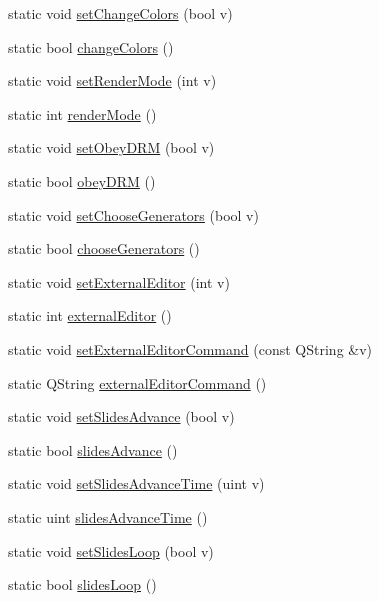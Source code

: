 \begin{DoxyCompactItemize}
static void \hyperlink{classOkular_1_1SettingsCore_a4fb9293ad6123555f4dde8d8695a288d}{set\+Change\+Colors} (bool v)
\item 
static bool \hyperlink{classOkular_1_1SettingsCore_af01449e331a4e973d5cb3879a3e76081}{change\+Colors} ()
\item 
static void \hyperlink{classOkular_1_1SettingsCore_a6e942364ec55191916e68be6ebeb852f}{set\+Render\+Mode} (int v)
\item 
static int \hyperlink{classOkular_1_1SettingsCore_a6fcb9ee5ad7a92b49ad31344771cca2d}{render\+Mode} ()
\item 
static void \hyperlink{classOkular_1_1SettingsCore_ae07e93cb9f46431bab5e2d505c925335}{set\+Obey\+D\+R\+M} (bool v)
\item 
static bool \hyperlink{classOkular_1_1SettingsCore_a82fd038193ed2d82ac25e7c1918c09e6}{obey\+D\+R\+M} ()
\item 
static void \hyperlink{classOkular_1_1SettingsCore_ac5989b63ba7f059c6820c5498cd3f7e5}{set\+Choose\+Generators} (bool v)
\item 
static bool \hyperlink{classOkular_1_1SettingsCore_acceeadb86e54c1c6b6141ff06c3165f1}{choose\+Generators} ()
\item 
static void \hyperlink{classOkular_1_1SettingsCore_a66de61ae5a760b2aca818315678d2a77}{set\+External\+Editor} (int v)
\item 
static int \hyperlink{classOkular_1_1SettingsCore_afb3fbb0d886a4d9619be4f289e091caf}{external\+Editor} ()
\item 
static void \hyperlink{classOkular_1_1SettingsCore_acdef582fb6dd1d8d778505ed9f425723}{set\+External\+Editor\+Command} (const Q\+String \&v)
\item 
static Q\+String \hyperlink{classOkular_1_1SettingsCore_a2eae0942d8ffbed99c7b9198f2dc03f2}{external\+Editor\+Command} ()
\item 
static void \hyperlink{classOkular_1_1SettingsCore_ae8fd0222c7cc648911fadd0737465baf}{set\+Slides\+Advance} (bool v)
\item 
static bool \hyperlink{classOkular_1_1SettingsCore_ae778283eb0b083eb09f97f81545f683d}{slides\+Advance} ()
\item 
static void \hyperlink{classOkular_1_1SettingsCore_aa659d9f4caa8ba3b27e8cc63ecd08c6b}{set\+Slides\+Advance\+Time} (uint v)
\item 
static uint \hyperlink{classOkular_1_1SettingsCore_a9d85611b6fa275a51c57b84c375d27f4}{slides\+Advance\+Time} ()
\item 
static void \hyperlink{classOkular_1_1SettingsCore_a167a085d32e415613afa64877c01b0da}{set\+Slides\+Loop} (bool v)
\item 
static bool \hyperlink{classOkular_1_1SettingsCore_a0e9b9664301a709c28b837394daa5098}{slides\+Loop} ()
\end{DoxyCompactItemize}
